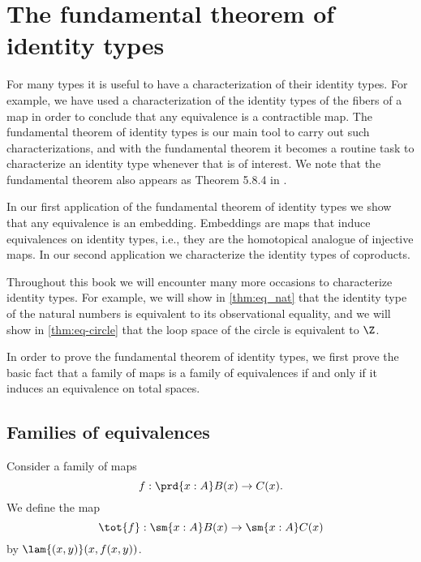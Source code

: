 
\section{The fundamental theorem of identity types}\label{chap:fundamental}

For many types it is useful to have a characterization of their identity types. For example, we have used a characterization of the identity types of the fibers of a map in order to conclude that any equivalence is a contractible map. The fundamental theorem of identity types is our main tool to carry out such characterizations, and with the fundamental theorem it becomes a routine task to characterize an identity type whenever that is of interest. We note that the fundamental theorem also appears as Theorem 5.8.4 in \cite{hottbook}.

In our first application of the fundamental theorem of identity types we show that any equivalence is an embedding. Embeddings are maps that induce equivalences on identity types, i.e., they are the homotopical analogue of injective maps. In our second application we characterize the identity types of coproducts.

Throughout this book we will encounter many more occasions to characterize identity types. For example, we will show in \cref{thm:eq_nat} that the identity type of the natural numbers is equivalent to its observational equality, and we will show in \cref{thm:eq-circle} that the loop space of the circle is equivalent to $\Z$.

In order to prove the fundamental theorem of identity types, we first prove the basic fact that a family of maps is a family of equivalences if and only if it induces an equivalence on total spaces. 

\subsection{Families of equivalences}

\begin{defn}
Consider a family of maps
\begin{equation*}
f : \prd{x:A}B(x)\to C(x).
\end{equation*}
We define the map
\begin{equation*}
\tot{f}:\sm{x:A}B(x)\to\sm{x:A}C(x)
\end{equation*}
by $\lam{(x,y)}(x,f(x,y))$.
\end{defn}


